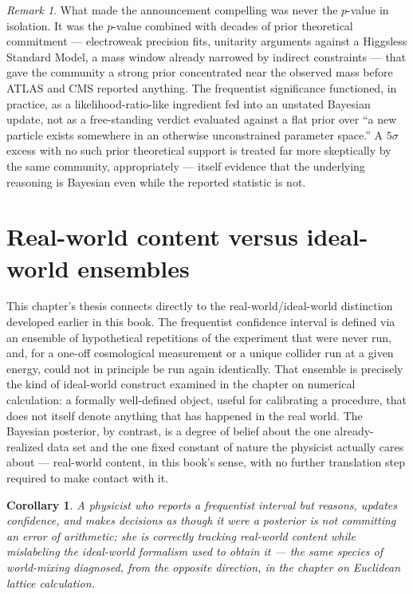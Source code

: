 \documentclass[11pt]{book}
\theoremstyle{definition}
\theoremstyle{plain}
\newtheorem{corollary}[definition]{Corollary}
\theoremstyle{remark}
\newtheorem{remark}[definition]{Remark}
\begin{document}
\begin{remark}
What made the announcement compelling was never the $p$-value in isolation. It was the $p$-value combined with decades of prior theoretical commitment --- electroweak precision fits, unitarity arguments against a Higgsless Standard Model, a mass window already narrowed by indirect constraints --- that gave the community a strong prior concentrated near the observed mass before ATLAS and CMS reported anything. The frequentist significance functioned, in practice, as a likelihood-ratio-like ingredient fed into an unstated Bayesian update, not as a free-standing verdict evaluated against a flat prior over ``a new particle exists somewhere in an otherwise unconstrained parameter space.'' A $5\sigma$ excess with no such prior theoretical support is treated far more skeptically by the same community, appropriately --- itself evidence that the underlying reasoning is Bayesian even while the reported statistic is not.
\end{remark}

\section{Real-world content versus ideal-world ensembles}

This chapter's thesis connects directly to the real-world/ideal-world distinction developed earlier in this book. The frequentist confidence interval is defined via an ensemble of hypothetical repetitions of the experiment that were never run, and, for a one-off cosmological measurement or a unique collider run at a given energy, could not in principle be run again identically. That ensemble is precisely the kind of ideal-world construct examined in the chapter on numerical calculation: a formally well-defined object, useful for calibrating a procedure, that does not itself denote anything that has happened in the real world. The Bayesian posterior, by contrast, is a degree of belief about the one already-realized data set and the one fixed constant of nature the physicist actually cares about --- real-world content, in this book's sense, with no further translation step required to make contact with it.

\begin{corollary}
A physicist who reports a frequentist interval but reasons, updates confidence, and makes decisions as though it were a posterior is not committing an error of arithmetic; she is correctly tracking real-world content while mislabeling the ideal-world formalism used to obtain it --- the same species of world-mixing diagnosed, from the opposite direction, in the chapter on Euclidean lattice calculation.
\end{corollary}
\end{document}
